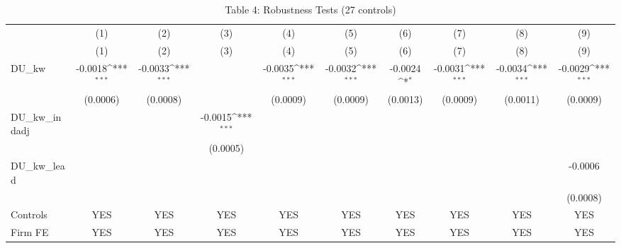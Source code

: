 \begin{table}[htbp]\centering
\def\sym#1{\ifmmode^{#1}\else\(^{#1}\)\fi}
\caption{Table 4: Robustness Tests (27 controls)}
\begin{tabular}{l*{9}{c}}
\toprule
          &\multicolumn{1}{c}{(1)}&\multicolumn{1}{c}{(2)}&\multicolumn{1}{c}{(3)}&\multicolumn{1}{c}{(4)}&\multicolumn{1}{c}{(5)}&\multicolumn{1}{c}{(6)}&\multicolumn{1}{c}{(7)}&\multicolumn{1}{c}{(8)}&\multicolumn{1}{c}{(9)}\\
          &\multicolumn{1}{c}{(1)}&\multicolumn{1}{c}{(2)}&\multicolumn{1}{c}{(3)}&\multicolumn{1}{c}{(4)}&\multicolumn{1}{c}{(5)}&\multicolumn{1}{c}{(6)}&\multicolumn{1}{c}{(7)}&\multicolumn{1}{c}{(8)}&\multicolumn{1}{c}{(9)}\\
\midrule
DU\_kw     &  -0.0018\sym{***}&  -0.0033\sym{***}&                  &  -0.0035\sym{***}&  -0.0032\sym{***}&  -0.0024\sym{*}  &  -0.0031\sym{***}&  -0.0034\sym{***}&  -0.0029\sym{***}\\
          & (0.0006)         & (0.0008)         &                  & (0.0009)         & (0.0009)         & (0.0013)         & (0.0009)         & (0.0011)         & (0.0009)         \\
\addlinespace
DU\_kw\_indadj&                  &                  &  -0.0015\sym{***}&                  &                  &                  &                  &                  &                  \\
          &                  &                  & (0.0005)         &                  &                  &                  &                  &                  &                  \\
\addlinespace
DU\_kw\_lead&                  &                  &                  &                  &                  &                  &                  &                  &  -0.0006         \\
          &                  &                  &                  &                  &                  &                  &                  &                  & (0.0008)         \\
\midrule
Controls  &      YES         &      YES         &      YES         &      YES         &      YES         &      YES         &      YES         &      YES         &      YES         \\
Firm FE   &      YES         &      YES         &      YES         &      YES         &      YES         &      YES         &      YES         &      YES         &      YES         \\

\end{tabular}
\end{table}

